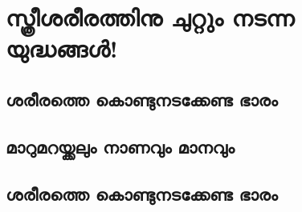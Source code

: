 \chapter{സ്ത്രീശരീരത്തിനു ചുറ്റും നടന്ന യുദ്ധങ്ങൾ!}
\label{chapter7}
\section{ശരീരത്തെ കൊണ്ടുനടക്കേണ്ട ഭാരം}
\label{ch7sec1}
\section{മാറുമറയ്ക്കലും നാണവും മാനവും}
\label{ch7sec2}
\section{ശരീരത്തെ കൊണ്ടുനടക്കേണ്ട ഭാരം}
\label{ch7sec3}
